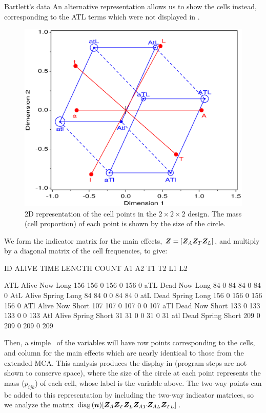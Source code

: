 \begin{Example}[bartlett]{Bartlett's data}
An alternative representation allows us to show the cells instead, corresponding
to the ATL terms which were not displayed in .
\begin{figure}[htb]
  \centering
  \includegraphics[scale=.7,clip]{ch5/fig/mcagen1}
  \caption[2D representation of the cell points in the $2\times 2 \times 2$ design]{2D representation of the cell points in the $2\times 2 \times 2$ design.  The mass (cell proportion) of each point is shown by the size of the circle.}\label{fig:mcagen1}
\end{figure}
We form the indicator matrix for the main effects,
$\bm{Z} = [
 \bm{Z}_A  \bm{Z}_T  \bm{Z}_L ]$,
and multiply by a diagonal matrix of the cell frequencies, to give:
\begin{output}
   ID    ALIVE   TIME     LENGTH   COUNT    A1    A2    T1    T2    L1    L2

   ATL   Alive   Now      Long      156    156     0   156     0   156     0
   aTL   Dead    Now      Long       84      0    84    84     0    84     0
   AtL   Alive   Spring   Long       84     84     0     0    84    84     0
   atL   Dead    Spring   Long      156      0   156     0   156   156     0
   ATl   Alive   Now      Short     107    107     0   107     0     0   107
   aTl   Dead    Now      Short     133      0   133   133     0     0   133
   Atl   Alive   Spring   Short      31     31     0     0    31     0    31
   atl   Dead    Spring   Short     209      0   209     0   209     0   209
\end{output}
Then, a simple \CA\ of the variables  will have row points
corresponding to the cells, and column for the main effects which are
nearly identical to those from the extended MCA.
This analysis produces the display in 
(program steps are not shown to conserve space), where the
size of the circle at each point represents the mass ($p_{ijk}$) of each
cell, whose label is the  variable above.
The two-way points can be added to this representation by including the two-way indicator matrices, so we analyze the matrix
$\mathrm{diag}\, (\bm{n}) [
 \bm{Z}_A  \bm{Z}_T  \bm{Z}_L  \bm{Z}_{AT}
 \bm{Z}_{AL}  \bm{Z}_{TL}
]$.
\end{Example}
